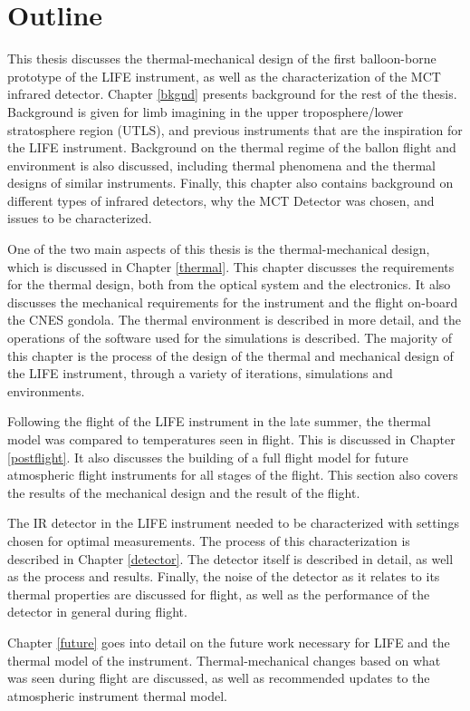 \section{Outline}
This thesis discusses the thermal-mechanical design of the first balloon-borne prototype of the LIFE instrument, as well as the characterization of the MCT infrared detector. Chapter \ref{bkgnd} presents background for the rest of the thesis. Background is given for limb imagining in the upper troposphere/lower stratosphere region (UTLS), and previous instruments that are the inspiration for the LIFE instrument. Background on the thermal regime of the ballon flight and environment is also discussed, including thermal phenomena and the thermal designs of similar instruments. Finally, this chapter also contains background on different types of infrared detectors, why the MCT Detector was chosen, and issues to be characterized.

One of the two main aspects of this thesis is the thermal-mechanical design, which is discussed in Chapter \ref{thermal}. This chapter discusses the requirements for the thermal design, both from the optical system and the electronics. It also discusses the mechanical requirements for the instrument and the flight on-board the CNES gondola. The thermal environment is described in more detail, and the operations of the software used for the simulations is described. The majority of this chapter is the process of the design of the thermal and mechanical design of the LIFE instrument, through a variety of iterations, simulations and environments.

Following the flight of the LIFE instrument in the late summer, the thermal model was compared to temperatures seen in flight. This is discussed in Chapter \ref{postflight}. It also discusses the building of a full flight model for future atmospheric flight instruments for all stages of the flight. This section also covers the results of the mechanical design and the result of the flight.

The IR detector in the LIFE instrument needed to be characterized with settings chosen for optimal measurements. The process of this characterization is described in Chapter \ref{detector}. The detector itself is described in detail, as well as the process and results. Finally, the noise of the detector as it relates to its thermal properties are discussed for flight, as well as the performance of the detector in general during flight.

Chapter \ref{future} goes into detail on the future work necessary for LIFE and the thermal model of the instrument. Thermal-mechanical changes based on what was seen during flight are discussed, as well as recommended updates to the atmospheric instrument thermal model.